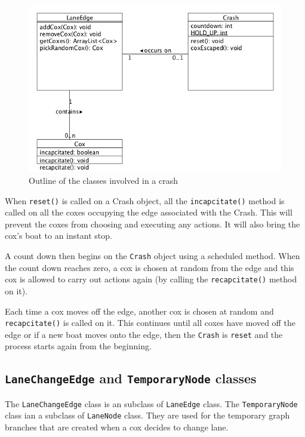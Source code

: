\begin{figure}
\begin{center}
  \includegraphics[scale=0.3]{images/crashing.png}
  \caption{Outline of the classes involved in a crash}
  \label{software:fig:crashingUML}
\end{center}
\end{figure}


When \texttt{reset()} is called on a Crash object, all the
\texttt{incapcitate()} method is called on all the coxes
occupying the edge associated with the Crash. This will prevent the
coxes from choosing and executing any actions. It will also bring the
cox's boat to an instant stop.

A count down then begins on the \texttt{Crash} object using a
scheduled method. When the count down reaches zero, a cox is chosen at
random from the edge and this cox is allowed to carry out actions
again (by calling the \texttt{recapcitate()} method on it).

Each time a cox moves off the edge, another cox is chosen at
random and \texttt{recapcitate()} is called on it. This continues
until all coxes have moved off the edge or if a new boat moves onto
the edge, then the \texttt{Crash} is \texttt{reset} and the process starts
again from the beginning.

\subsection{\texttt{LaneChangeEdge} and \texttt{TemporaryNode} classes}\label{software:lane:lanechange}

The \texttt{LaneChangeEdge} class is an subclass of \texttt{LaneEdge} class. The
\texttt{TemporaryNode} class ian a subclass of \texttt{LaneNode} class. They are used
for the temporary graph branches that are created when a cox decides
to change lane.

